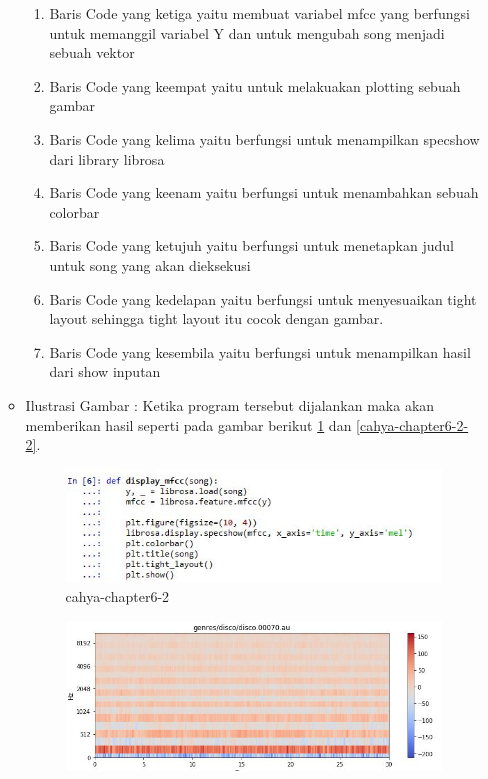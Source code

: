 \begin{enumerate}
\begin{itemize}
\begin{enumerate}
\item Baris Code yang ketiga yaitu membuat variabel mfcc yang berfungsi untuk memanggil variabel Y dan untuk mengubah song menjadi sebuah vektor
\item Baris Code yang keempat yaitu untuk melakuakan plotting sebuah gambar
\item Baris Code yang kelima yaitu berfungsi untuk menampilkan specshow dari library librosa
\item Baris Code yang keenam yaitu berfungsi untuk menambahkan sebuah colorbar
\item Baris Code yang ketujuh yaitu berfungsi untuk menetapkan judul untuk song yang akan dieksekusi
\item Baris Code yang kedelapan yaitu berfungsi untuk menyesuaikan tight layout sehingga tight layout itu cocok dengan gambar.
\item Baris Code yang kesembila yaitu berfungsi untuk menampilkan hasil dari show inputan
\end{enumerate}
\par
\item Ilustrasi Gambar : Ketika program tersebut dijalankan maka akan memberikan hasil seperti pada gambar berikut \ref {cahya-chapter6-2} dan \ref{cahya-chapter6-2-2}.
\par
\begin{figure}[!hbtp]
\centering
\includegraphics[scale=0.2]{figures/cahya-chapter6-2.jpg}
\caption{cahya-chapter6-2}
\label{cahya-chapter6-2}
\end{figure}
\par
\begin{figure}[!hbtp]
\centering
\includegraphics[scale=0.2]{figures/cahya-chapter6-2-2.jpg}

\end{figure}
\end{itemize}
\end{enumerate}
